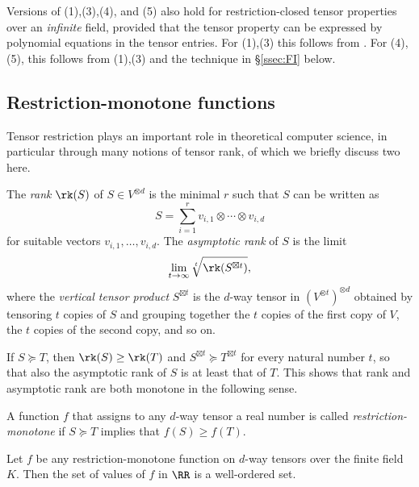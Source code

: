 \documentclass{amsart}
\begin{document}
\begin{re} \label{re:InfiniteFields}
Versions of (1),(3),(4), and (5) also hold for restriction-closed tensor
properties over an {\em infinite} field, provided that the tensor property
can be expressed by polynomial equations in the tensor
entries. For (1),(3) this follows from \cite{Draisma17}. For
(4),(5), this follows from (1),(3) and the technique in
\S\ref{ssec:FI} below.
\end{re}

\subsection{Restriction-monotone functions}

Tensor restriction plays an important role in theoretical computer
science, in particular through many notions of tensor rank,
of which we briefly discuss two here. 

\begin{de}
The {\em rank} $\rk(S)$ of $S \in V^{\otimes d}$ is the minimal $r$
such that $S$ can be written as 
\[ S=\sum_{i=1}^r v_{i,1} \otimes \cdots \otimes v_{i,d} \]
for suitable vectors $v_{i,1},\ldots,v_{i,d}$. 
The {\em asymptotic rank} of $S$ is the limit  
\[ \lim_{t \to \infty} \sqrt[t]{\rk(S^{\boxtimes t})}, \]
where the {\em vertical tensor product} $S^{\boxtimes t}$ is the $d$-way
tensor in $(V^{\otimes t})^{\otimes d}$ obtained by tensoring $t$ copies
of $S$ and grouping together the $t$ copies of the first copy of $V$,
the $t$ copies of the second copy, and so on.
\end{de}

If $S \succeq T$, then $\rk(S) \geq \rk(T)$ and $S^{\boxtimes t} \succeq
T^{\boxtimes t}$ for every natural number $t$, so that also the asymptotic
rank of $S$ is at least that of $T$. This shows that rank and asymptotic
rank are both monotone in the following sense.

\begin{de}
A function $f$ that assigns to any $d$-way tensor a real
number is called {\em restriction-monotone} if $S \succeq T$
implies that $f(S) \geq f(T)$. 
\end{de}

\begin{cor} \label{cor:WellOrdered}
Let $f$ be any restriction-monotone function on $d$-way tensors over
the finite field $K$. Then the set of values of $f$ in $\RR$ is a
well-ordered set.
\end{cor}
\end{document}
